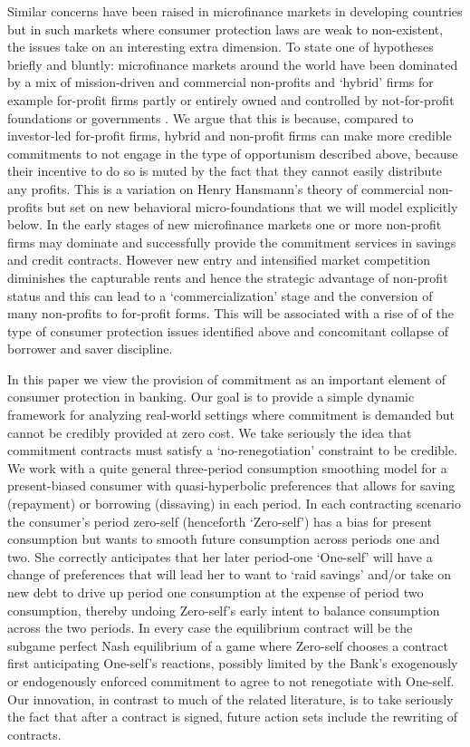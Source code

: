 \documentclass[11pt,english]{article}
\theoremstyle{plain}
\theoremstyle{definition}
\begin{document}
Similar concerns have been raised in microfinance markets in developing
countries but in such markets where consumer protection laws are weak
to non-existent, the issues take on an interesting extra dimension.
To state one of hypotheses briefly and bluntly: microfinance markets
around the world have been dominated by a mix of mission-driven and
commercial non-profits and `hybrid' firms \textendash{} for example
for-profit firms partly or entirely owned and controlled by not-for-profit
foundations or governments \citep{conning_microfinance_2011,cull_microfinance_2009}.
We argue that this is because, compared to investor-led for-profit
firms, hybrid and non-profit firms can make more credible commitments
to not engage in the type of opportunism described above, because
their incentive to do so is muted by the fact that they cannot easily
distribute any profits. This is a variation on Henry Hansmann's theory
of commercial non-profits but set on new behavioral micro-foundations
that we will model explicitly below. In the early stages of new microfinance
markets one or more non-profit firms may dominate and successfully
provide the commitment services in savings and credit contracts. However
new entry and intensified market competition diminishes the capturable
rents and hence the strategic advantage of non-profit status and this
can lead to a `commercialization' stage and the conversion of many
non-profits to for-profit forms. This will be associated with a rise
of of the type of consumer protection issues identified above and
concomitant collapse of borrower and saver discipline.

In this paper we view the provision of commitment as an important
element of consumer protection in banking. Our goal is to provide
a simple dynamic framework for analyzing real-world settings where
commitment is demanded but cannot be credibly provided at zero cost.
We take seriously the idea that commitment contracts must satisfy
a `no-renegotiation' constraint to be credible. We work with a quite
general three-period consumption smoothing model for a present-biased
consumer with quasi-hyperbolic preferences that allows for saving
(repayment) or borrowing (dissaving) in each period. In each contracting
scenario the consumer's period zero-self (henceforth `Zero-self')
has a bias for present consumption but wants to smooth future consumption
across periods one and two. She correctly anticipates that her later
period-one `One-self' will have a change of preferences that will
lead her to want to `raid savings' and/or take on new debt to drive
up period one consumption at the expense of period two consumption,
thereby undoing Zero-self's early intent to balance consumption across
the two periods. In every case the equilibrium contract will be the
subgame perfect Nash equilibrium of a game where Zero-self chooses
a contract first anticipating One-self's reactions, possibly limited
by the Bank's exogenously or endogenously enforced commitment to agree
to not renegotiate with One-self. Our innovation, in contrast to much
of the related literature, is to take seriously the fact that after
a contract is signed, future action sets include the rewriting of
contracts.
\end{document}
